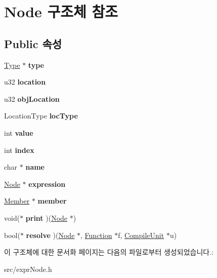 \hypertarget{struct_node}{}\section{Node 구조체 참조}
\label{struct_node}
\subsection*{Public 속성}
\begin{DoxyCompactItemize}
\item 
\mbox{\label{struct_node_ae5bfe58e068d3ebbf9e5de3b9429ce78}} 
\mbox{\hyperlink{struct_type}{Type}} $\ast$ {\bfseries type}
\item 
\mbox{\label{struct_node_af29d6730c1ae4dfa7a901ae7611b0973}} 
u32 {\bfseries location}
\item 
\mbox{\label{struct_node_ab16254ec466168164ba6e5790396c3cc}} 
u32 {\bfseries obj\+Location}
\item 
\mbox{\label{struct_node_a844bc1a892e4efae954736f91a068ba2}} 
Location\+Type {\bfseries loc\+Type}
\item 
\mbox{\label{struct_node_aaa0cd30d78a90c5a6ab64eb3d58b8f87}} 
int {\bfseries value}
\item 
\mbox{\label{struct_node_ac8055cdbda20cacce417192557741ab8}} 
int {\bfseries index}
\item 
\mbox{\label{struct_node_a059a0ea6f86dce9fd919c08a707b360b}} 
char $\ast$ {\bfseries name}
\item 
\mbox{\label{struct_node_a1a1f36a3a65310a67b4e6e10b595d5a4}} 
\mbox{\hyperlink{struct_node}{Node}} $\ast$ {\bfseries expression}
\item 
\mbox{\label{struct_node_aa221d21bde05ecda9cca447fdd550ca0}} 
\mbox{\hyperlink{struct_member}{Member}} $\ast$ {\bfseries member}
\item 
\mbox{\label{struct_node_a8023bbc1d73f9273930ef05ef20f7404}} 
void($\ast$ {\bfseries print} )(\mbox{\hyperlink{struct_node}{Node}} $\ast$)
\item 
\mbox{\label{struct_node_a9d300576a9dcaf307b6c3b7da0d24ede}} 
bool($\ast$ {\bfseries resolve} )(\mbox{\hyperlink{struct_node}{Node}} $\ast$, \mbox{\hyperlink{struct_function}{Function}} $\ast$f, \mbox{\hyperlink{struct_compile_unit}{Compile\+Unit}} $\ast$u)
\end{DoxyCompactItemize}


이 구조체에 대한 문서화 페이지는 다음의 파일로부터 생성되었습니다.\+:\begin{DoxyCompactItemize}
\item 
src/expr\+Node.\+h\end{DoxyCompactItemize}
